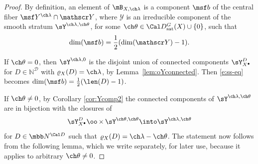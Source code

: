 \documentclass[final]{amsart}
\theoremstyle{remark}
\theoremstyle{definition}
\DeclareMathOperator*{\xt}{\times}
\numberwithin{equation}{section}
\begin{document}
\begin{proof}
By definition, an element of $\mB_{X,\ch\lambda}$ is a component $\msf b$ of the central fiber $\msf Y^{\ch\lambda}\cap \mathscr Y$, where $\mathscr Y$ is an irreducible component of the smooth stratum $\sY^{\ch\lambda,\ch\theta}$, for some $\ch\theta \in \Cal D^G_{\mathrm{sat}}(X)\cup\{0\}$, such that 
\begin{equation} \label{e:ss-eq}
    \dim (\msf b) = \frac 1 2 ( \dim (\mathscr Y) -1).
\end{equation}

If $\ch\theta=0$, then $\sY^{\ch\lambda,0}$ is the disjoint union of 
connected components $\sY^D_{X^\bullet}$ 
for $D\in \mathbb N^{\mathcal D}$ with $\varrho_X(D) =\ch\lambda$, by Lemma~\ref{lem:oYconnected}. 
Then 
\eqref{e:ss-eq} becomes $\dim(\msf b)
= \frac 1 2 (\len(D)-1) $. 

If $\ch\theta \ne 0$, by Corollary \ref{cor:Ycomp2} the connected components of $\sY^{\ch\lambda,\ch\theta}$ are
in bijection with the closures of 
\[ \sY^{D}_{X^\bullet} \oo\xt \sY^{\ch\theta,\ch\theta} \into \sY^{\ch\lambda,\ch\theta} \]
for $D\in \mbb N^{\Cal D}$ such that $\varrho_X(D) = \ch\lambda-\ch\theta$. The statement now follows from the following lemma, which we write separately, for later use, because it applies to arbitrary $\ch\theta \ne 0$.







\end{proof}
\end{document}
